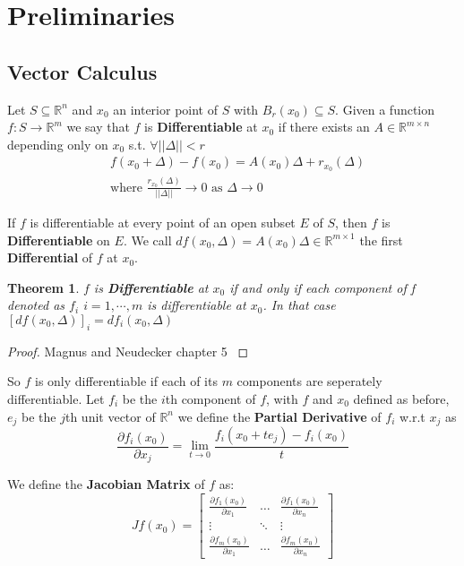 \documentclass[]{article}
\theoremstyle{mattstyle}
\newtheorem{theorem}{Theorem}[section]
\theoremstyle{definition}
\begin{document}
\newpage

\section{Preliminaries}

\subsection{Vector Calculus}

Let $S \subseteq \mathbb{R}^n$ and $x_0$ an interior point of $S$ with $B_r(x_0) \subseteq S$. Given a function $f: S \rightarrow \mathbb{R}^m$ we say that $f$ is \textbf{Differentiable} at $x_0$ if there exists an $A \in \mathbb{R}^{m \times n}$ depending only on $x_0$ s.t. $\forall ||\Delta|| < r$
\begin{align*}
&f(x_0 + \Delta) - f(x_0) = A(x_0)\Delta + r_{x_0}(\Delta)\\
&\text{where $\frac{r_{x_0}(\Delta)}{||\Delta||}\rightarrow 0$ as $\Delta \rightarrow 0$}
\end{align*}

If $f$ is differentiable at every point of an open subset $E$ of $S$, then $f$ is \textbf{Differentiable} on $E$. We call $df(x_0, \Delta) = A(x_0)\Delta \in \mathbb{R}^{m \times 1}$ the first \textbf{Differential} of $f$ at $x_0$.

\begin{theorem}
	$f$ is \textbf{Differentiable} at $x_0$ if and only if each component of f denoted as $f_i$ $i=1,\cdots, m$ is differentiable at $x_0$. In that case $[df(x_0, \Delta)]_i = df_i(x_0, \Delta)$
\end{theorem}
\begin{proof}
	Magnus and Neudecker chapter 5 \cite{magnus1988matrix}
\end{proof}

So $f$ is only differentiable if each of its $m$ components are seperately differentiable. Let $f_i$ be the $i$th component of $f$, with $f$ and $x_0$ defined as before, $e_j$ be the $j$th unit vector of $\mathbb{R}^n$ we define the \textbf{Partial Derivative} of $f_i$ w.r.t $x_j$ as
$$
\frac{\partial f_i(x_0)}{\partial x_j} = \lim\limits_{t \rightarrow 0} \frac{f_i(x_0+te_j) - f_i(x_0)}{t}
$$

We define the \textbf{Jacobian Matrix} of $f$ as:
$$ Jf(x_0) =  \begin{bmatrix}
\frac{\partial f_1(x_0)}{\partial x_1} & \dots  & \frac{\partial f_1(x_0)}{\partial x_n} \\
\vdots & \ddots & \vdots \\
\frac{\partial f_m(x_0)}{\partial x_1} & \dots  & \frac{\partial f_m(x_0)}{\partial x_n}
\end{bmatrix}$$
\end{document}

